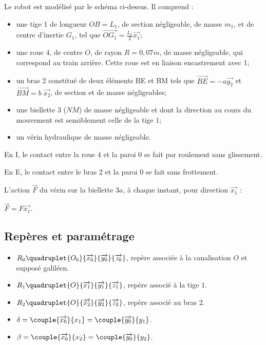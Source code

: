 \begin{multicols}{2}
Le robot est modélisé par le schéma ci-dessus. Il comprend :
\begin{itemize}
\item une tige 1 de longueur $OB=L_1$, de section négligeable, de masse $m_1$, et de centre d'inertie $G_1$, tel que $\overrightarrow{OG_1}=\frac{L_1}{2}\overrightarrow{x_1}$;
\item une roue $4$, de centre $O$, de rayon $R = 0,07 m$, de masse négligeable, qui
correspond au train arrière. Cette roue est en liaison encastrement avec 1;
\item un bras 2 constitué de deux éléments BE et BM tels que $\overrightarrow{BE}=-a\overrightarrow{y_2}$ et $\overrightarrow{BM}=b\;\overrightarrow{x_2}$, de section et de masse négligeables;
\item une biellette 3 ($NM$) de masse négligeable et dont la direction au cours
du mouvement est sensiblement celle de la tige $1$;
\item un vérin hydraulique de masse négligeable.
\end{itemize}

 En I, le contact entre la roue 4 et la paroi 0 se fait par roulement sans glissement.

 En E, le contact entre le bras 2 et la paroi 0 se fait sans frottement.

 L'action $\overrightarrow{F}$ du vérin sur la biellette $3a$, à chaque instant, pour direction $\overrightarrow{x_1}$ :

$\overrightarrow{F} = F \overrightarrow{x_1}.$


\subsection*{Repères et paramétrage}
\begin{itemize}
\item $R_0\quadruplet{O_0}{\overrightarrow{x_0}}{\overrightarrow{y_0}}{\overrightarrow{z_0}}$, repère associée à la canalisation $O$ et supposé galiléen.
\item $R_1\quadruplet{O}{\overrightarrow{x_1}}{\overrightarrow{y_1}}{\overrightarrow{z_1}}$, repère associé à la tige $1$.
\item $R_2\quadruplet{O}{\overrightarrow{x_2}}{\overrightarrow{y_2}}{\overrightarrow{z_2}}$, repère associé au bras $2$.
\item $\delta=\couple{\overrightarrow{x_0}}{{x_1}}=\couple{\overrightarrow{y_0}}{{y_1}}$.
\item $\beta=\couple{\overrightarrow{x_0}}{{x_2}}=\couple{\overrightarrow{y_0}}{{y_2}}$.
\end{itemize}


\end{multicols}
